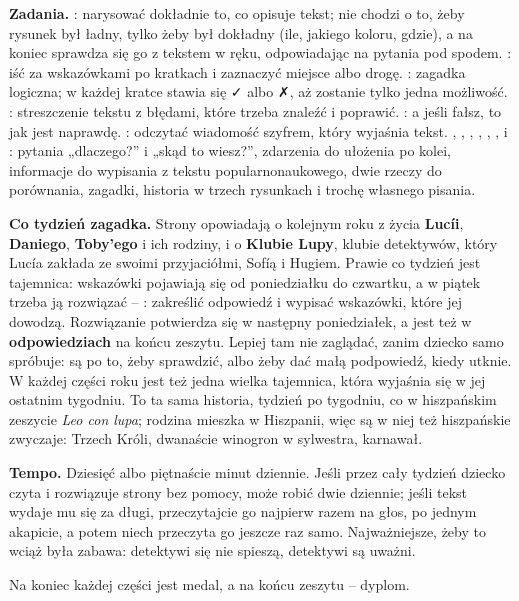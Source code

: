 \textbf{Zadania.} \textbf{\lblDibujaConLupa}: narysować dokładnie to, co
opisuje tekst; nie chodzi o to, żeby rysunek był ładny, tylko żeby był
dokładny (ile, jakiego koloru, gdzie), a na koniec sprawdza się go z
tekstem w ręku, odpowiadając na pytania pod spodem. \textbf{\lblMapa}:
iść za wskazówkami po kratkach i zaznaczyć miejsce albo drogę.
\textbf{\lblLogica}: zagadka logiczna; w każdej kratce stawia się ✓ albo
✗, aż zostanie tylko jedna możliwość. \textbf{\lblErrores}: streszczenie
tekstu z błędami, które trzeba znaleźć i poprawić.
\textbf{\lblVerdaderoFalso}: a jeśli fałsz, to jak jest naprawdę.
\textbf{\lblCodigo}: odczytać wiadomość szyfrem, który wyjaśnia tekst.
\textbf{\lblResponde}, \textbf{\lblOrdena}, \textbf{\lblRelaciona},
\textbf{\lblFicha}, \textbf{\lblCompara}, \textbf{\lblAdivina},
\textbf{\lblVinetas} i \textbf{\lblCrea}: pytania „dlaczego?” i „skąd to
wiesz?”, zdarzenia do ułożenia po kolei, informacje do wypisania z
tekstu popularnonaukowego, dwie rzeczy do porównania, zagadki, historia
w trzech rysunkach i trochę własnego pisania.

\textbf{Co tydzień zagadka.} Strony opowiadają o kolejnym roku z życia
\textbf{Lucíi}, \textbf{Daniego}, \textbf{Toby'ego} i ich rodziny, i o
\textbf{Klubie Lupy}, klubie detektywów, który Lucía zakłada ze swoimi
przyjaciółmi, Sofíą i Hugiem. Prawie co tydzień jest tajemnica:
wskazówki pojawiają się od poniedziałku do czwartku, a w piątek trzeba
ją rozwiązać -- \textbf{\lblCaso}: zakreślić odpowiedź i wypisać
wskazówki, które jej dowodzą. Rozwiązanie potwierdza się w następny
poniedziałek, a jest też w \textbf{odpowiedziach} na końcu zeszytu.
Lepiej tam nie zaglądać, zanim dziecko samo spróbuje: są po to, żeby
sprawdzić, albo żeby dać małą podpowiedź, kiedy utknie. W każdej części
roku jest też jedna wielka tajemnica, która wyjaśnia się w jej ostatnim
tygodniu. To ta sama historia, tydzień po tygodniu, co w hiszpańskim
zeszycie \emph{Leo con lupa}; rodzina mieszka w Hiszpanii, więc są w
niej też hiszpańskie zwyczaje: Trzech Króli, dwanaście winogron w
sylwestra, karnawał.

\textbf{Tempo.} Dziesięć albo piętnaście minut dziennie. Jeśli przez
cały tydzień dziecko czyta i rozwiązuje strony bez pomocy, może robić
dwie dziennie; jeśli tekst wydaje mu się za długi, przeczytajcie go
najpierw razem na głos, po jednym akapicie, a potem niech przeczyta go
jeszcze raz samo. Najważniejsze, żeby to wciąż była zabawa: detektywi
się nie spieszą, detektywi są uważni.

Na koniec każdej części jest medal, a na końcu zeszytu -- dyplom.
\newpage
